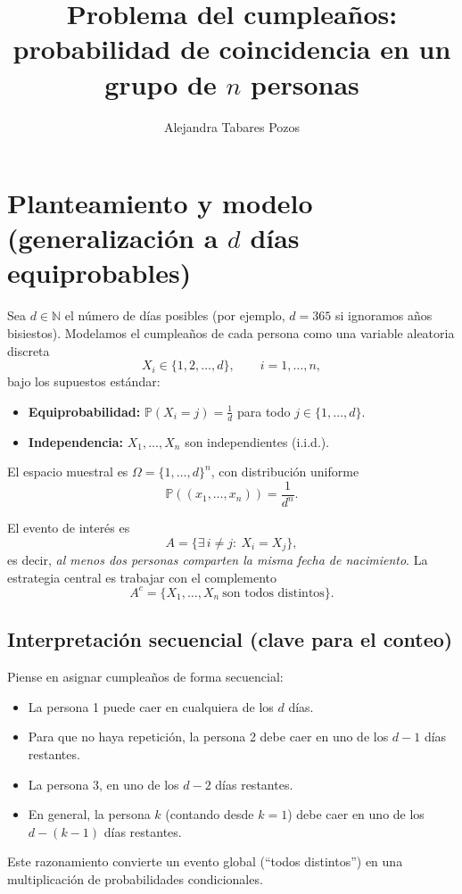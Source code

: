 \documentclass[11pt, letterpaper]{article}
\title{Problema del cumpleaños: probabilidad de coincidencia en un grupo de $n$ personas}
\author{Alejandra Tabares Pozos}
\date{}
\begin{document}
\maketitle
\tableofcontents
\newpage

\section{Planteamiento y modelo (generalización a $d$ días equiprobables)}

Sea $d\in\mathbb{N}$ el número de días posibles (por ejemplo, $d=365$ si ignoramos años bisiestos).
Modelamos el cumpleaños de cada persona como una variable aleatoria discreta
\[
X_i \in \{1,2,\dots,d\}, \qquad i=1,\dots,n,
\]
bajo los supuestos estándar:
\begin{itemize}
\item \textbf{Equiprobabilidad:} $\mathbb{P}(X_i=j)=\frac{1}{d}$ para todo $j\in\{1,\dots,d\}$.
\item \textbf{Independencia:} $X_1,\dots,X_n$ son independientes (i.i.d.).
\end{itemize}

El espacio muestral es $\Omega=\{1,\dots,d\}^n$, con distribución uniforme
\[
\mathbb{P}((x_1,\dots,x_n))=\frac{1}{d^n}.
\]

El evento de interés es
\[
A=\{\exists\, i\neq j:\ X_i=X_j\},
\]
es decir, \emph{al menos dos personas comparten la misma fecha de nacimiento}.
La estrategia central es trabajar con el complemento
\[
A^c=\{X_1,\dots,X_n\ \text{son todos distintos}\}.
\]

\subsection*{Interpretación secuencial (clave para el conteo)}
Piense en asignar cumpleaños de forma secuencial:
\begin{itemize}
\item La persona 1 puede caer en cualquiera de los $d$ días.
\item Para que no haya repetición, la persona 2 debe caer en uno de los $d-1$ días restantes.
\item La persona 3, en uno de los $d-2$ días restantes.
\item En general, la persona $k$ (contando desde $k=1$) debe caer en uno de los $d-(k-1)$ días restantes.
\end{itemize}
Este razonamiento convierte un evento global (``todos distintos'') en una multiplicación de probabilidades condicionales.
\end{document}
